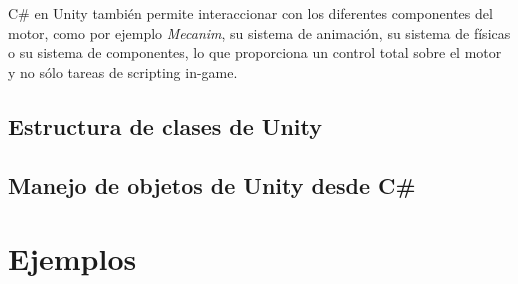 \documentclass{pre-tfg}
\begin{document}
C\# en Unity también permite interaccionar con los diferentes componentes del motor, como por ejemplo \emph{Mecanim}, su sistema de animación, su sistema de físicas o su sistema de componentes, lo que proporciona un control total sobre el motor y no sólo tareas de scripting in-game.

\subsection{Estructura de clases de Unity}

\subsection{Manejo de objetos de Unity desde C\#}

\section{Ejemplos}
\end{document}
